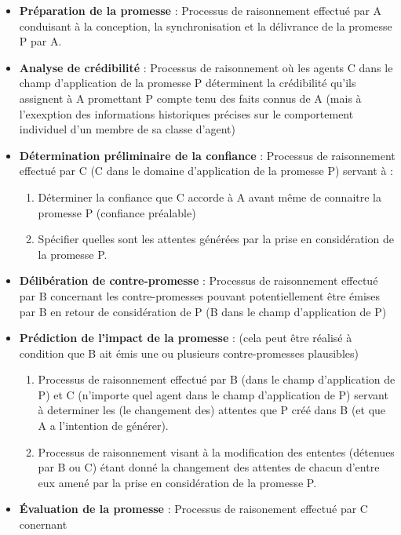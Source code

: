 \begin{itemize}
  \item \textbf{Préparation de la promesse} :
	Processus de raisonnement effectué par A conduisant à la conception, la
	synchronisation et la délivrance de la promesse P par A.
  \item \textbf{Analyse de crédibilité} :
	Processus de raisonnement où les agents C dans le champ d'application de
	la promesse P déterminent la crédibilité qu'ils assignent à A promettant
	P compte tenu des faits connus de A (mais à l'exexption des informations
	historiques précises sur le comportement individuel d'un membre de sa
	classe d'agent)
  \item \textbf{Détermination préliminaire de la confiance} :
	Processus de raisonnement effectué par C (C dans le domaine
	d'application de la promesse P) servant à :
  	\begin{enumerate}
	  \item Déterminer la confiance que C accorde à A avant même de
		  connaitre la promesse P (confiance préalable)
	  \item Spécifier quelles sont les attentes générées par la prise en
		  considération de la promesse P.
  	\end{enumerate}
  \item \textbf{Délibération de contre-promesse} :
	Processus de raisonnement effectué par B concernant les contre-promesses
	pouvant potentiellement être émises par B en retour de considération de
	P (B dans le champ d'application de P)
  \item \textbf{Prédiction de l'impact de la promesse} :
	(cela peut être réalisé à condition que B ait émis une ou plusieurs
	contre-promesses plausibles)
  	\begin{enumerate}
	  \item Processus de raisonnement effectué par B (dans le champ
		  d'application de P) et C (n'importe quel agent dans le champ
		  d'application de P) servant à determiner les (le changement
		  des) attentes que P créé dans B (et que A a l'intention de
		  générer).  
	  \item Processus de raisonnement visant à la modification des ententes
		  (détenues par B ou C) étant donné la changement des attentes
		  de chacun d'entre eux amené par la prise en considération de
		  la promesse P.
  	\end{enumerate}
  \item \textbf{Évaluation de la promesse} :
	Processus de raisonement effectué par C conernant
  	\begin{enumerate}

\end{enumerate}
\end{itemize}
